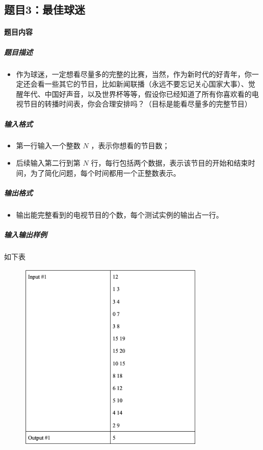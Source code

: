 \documentclass[12pt,a4paper]{ctexart}
\begin{document}
\subsection*{题目3：最佳球迷}
\paragraph{题目内容}
\subparagraph{题目描述}

\begin{itemize}
    \item 作为球迷，一定想看尽量多的完整的比赛，当然，作为新时代的好青年，你一定还会看一些其它的节目，比如新闻联播（永远不要忘记关心国家大事）、觉醒年代、中国好声音，以及世界杯等等，假设你已经知道了所有你喜欢看的电视节目的转播时间表，你会合理安排吗？（目标是能看尽量多的完整节目）
\end{itemize}

\subparagraph{输入格式}
    \begin{itemize}
        \item 第一行输入一个整数 $N$ ，表示你想看的节目数；
        \item 后续输入第二行到第 $N$ 行，每行包括两个数据，表示该节目的开始和结束时间，为了简化问题，每个时间都用一个正整数表示。
    \end{itemize}

\subparagraph{输出格式}
    \begin{itemize}
        \item 输出能完整看到的电视节目的个数，每个测试实例的输出占一行。
    \end{itemize}
    

\subparagraph{输入输出样例}
如下表
    \begin{figure}[hp]
        \centering
        \includegraphics[width=0.80\textwidth]{q3_iodata.png}
    \end{figure}
\end{document}
